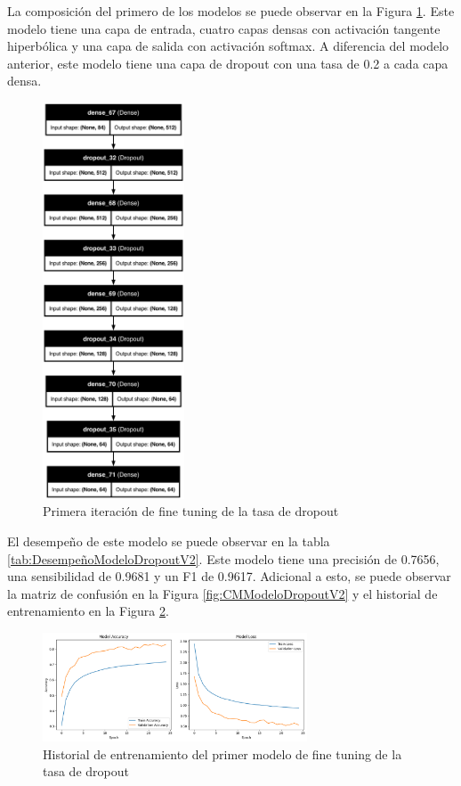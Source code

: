 La composición del primero de los modelos se puede observar en la Figura \ref{fig:ModeloDropoutV2}.
Este modelo tiene una capa de entrada, cuatro capas densas con activación tangente hiperbólica y una capa de salida con activación softmax.
A diferencia del modelo anterior, este modelo tiene una capa de dropout con una tasa de 0.2 a cada capa densa.

\begin{figure}[H]
    \centering
    \includegraphics[width=0.375\textwidth]{figuras/modelDropoutV2.png}
    \caption{Primera iteración de fine tuning de la tasa de dropout}
    \label{fig:ModeloDropoutV2}
\end{figure}

El desempeño de este modelo se puede observar en la tabla \ref{tab:DesempeñoModeloDropoutV2}.
Este modelo tiene una precisión de 0.7656, una sensibilidad de 0.9681 y un F1 de 0.9617.
Adicional a esto, se puede observar la matriz de confusión en la Figura \ref{fig:CMModeloDropoutV2} y el historial de entrenamiento en la Figura \ref{fig:HistoryModeloDropoutV2}.

\begin{figure}[H]
    \centering
    \includegraphics[width=0.7\textwidth]{figuras/modelDropoutV2History.png}
    \caption{Historial de entrenamiento del primer modelo de fine tuning de la tasa de dropout}
    \label{fig:HistoryModeloDropoutV2}
\end{figure}

